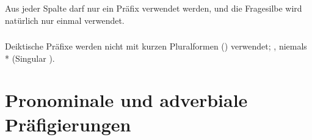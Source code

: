 \noindent Aus jeder Spalte darf nur ein Präfix verwendet werden, und die Fragesilbe wird natürlich nur einmal verwendet. 

\subsubsection{} Deiktische Präfixe werden nicht mit kurzen Pluralformen () verwendet;  , niemals * (Singular ). 


\section{Pronominale und adverbiale Präfigierungen}

